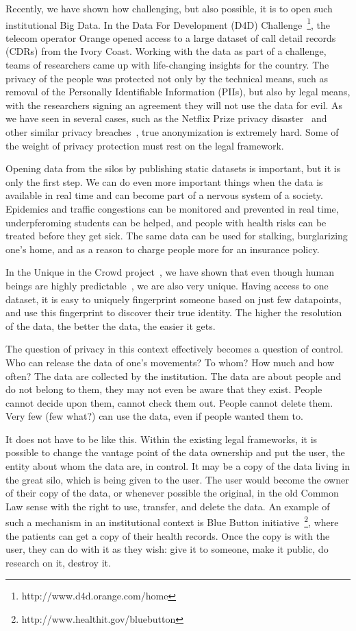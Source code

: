 Recently, we have shown how challenging, but also possible, it is to open such institutional Big Data.
In the Data For Development (D4D) Challenge~\footnote{http://www.d4d.orange.com/home}, the telecom operator Orange opened access to a large dataset of call detail records (CDRs) from the Ivory Coast.
Working with the data as part of a challenge, teams of researchers came up with life-changing insights for the country. 
The privacy of the people was protected not only by the technical means, such as removal of the Personally Identifiable Information (PIIs), but also by legal means, with the researchers signing an agreement they will not use the data for evil.
As we have seen in several cases, such as the Netflix Prize privacy disaster~\cite{narayanan2008robust} and other similar privacy breaches~\cite{sweeney2000simple}, true anonymization is extremely hard.  Some of the weight of privacy protection must rest on the legal framework.

Opening data from the silos by publishing static datasets is important, but it is only the first step. 
We can do even more important things when the data is available in real time and can become part of a nervous system of a society.
Epidemics and traffic congestions can be monitored and prevented in real time, underpferoming students can be helped, and people with health risks can be treated before they get sick.
The same data can be used for stalking, burglarizing one's home, and as a reason to charge people more for an insurance policy.

In the Unique in the Crowd project~\cite{de2013unique}, we have shown that even though human beings are highly predictable~\cite{song2010limits}, we are also very unique.
Having access to one dataset, it is easy to uniquely fingerprint someone based on just few datapoints, and use this fingerprint to discover their true identity. 
The higher the resolution of the data, the better the data, the easier it gets.

The question of privacy in this context effectively becomes a question of control. 
Who can release the data of one's movements?
To whom? 
How much and how often?
The data are collected by the institution.
The data are about people and do not belong to them, they may not even be aware that they exist.
People cannot decide upon them, cannot check them out.
People cannot delete them.
Very few (few what?) can use the data, even if people wanted them to.

It does not have to be like this.
Within the existing legal frameworks, it is possible to change the vantage point of the data ownership and put the user, the entity about whom the data are, in control.
It may be a copy of the data living in the great silo, which is being given to the user.
The user would become the owner of their copy of the data, or whenever possible the original, in the old Common Law sense with the right to use, transfer, and delete the data. 
An example of such a mechanism in an institutional context is Blue Button initiative~\footnote{http://www.healthit.gov/bluebutton}, where the patients can get a copy of their health records.
Once the copy is with the user, they can do with it as they wish: give it to someone, make it public, do research on it, destroy it.

